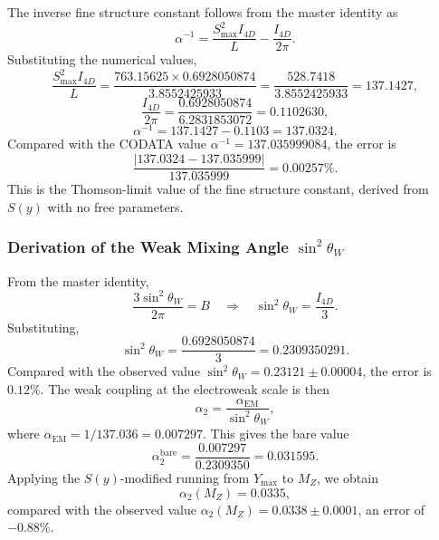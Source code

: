 \documentclass[a4paper,1pt,oneside,openany]{book}
\begin{document}
The inverse fine structure constant follows from the master identity as
\begin{equation}
\alpha^{-1} = \frac{S_{\max}^2 I_{4D}}{L} - \frac{I_{4D}}{2\pi}.
\label{eq:alpha-inv}
\end{equation}
Substituting the numerical values,
\begin{equation}
\frac{S_{\max}^2 I_{4D}}{L} = \frac{763.15625 \times 0.6928050874}{3.8552425933} = \frac{528.7418}{3.8552425933} = 137.1427,
\label{eq:alpha-term1}
\end{equation}
\begin{equation}
\frac{I_{4D}}{2\pi} = \frac{0.6928050874}{6.2831853072} = 0.1102630,
\label{eq:alpha-term2}
\end{equation}
\begin{equation}
\boxed{\alpha^{-1} = 137.1427 - 0.1103 = 137.0324.}
\label{eq:alpha-final}
\end{equation}
Compared with the CODATA value $\alpha^{-1} = 137.035999084$, the error is
\begin{equation}
\frac{|137.0324 - 137.035999|}{137.035999} = 0.00257\%.
\label{eq:alpha-error}
\end{equation}
This is the Thomson-limit value of the fine structure constant, derived from $S(y)$ with no free parameters.

\subsubsection{Derivation of the Weak Mixing Angle $\sin^2\theta_W$}

From the master identity,
\begin{equation}
\frac{3\sin^2\theta_W}{2\pi} = B \quad \Longrightarrow \quad \sin^2\theta_W = \frac{I_{4D}}{3}.
\label{eq:sin2}
\end{equation}
Substituting,
\begin{equation}
\boxed{\sin^2\theta_W = \frac{0.6928050874}{3} = 0.2309350291.}
\label{eq:sin2-final}
\end{equation}
Compared with the observed value $\sin^2\theta_W = 0.23121 \pm 0.00004$, the error is $0.12\%$. The weak coupling at the electroweak scale is then
\begin{equation}
\alpha_2 = \frac{\alpha_{\mathrm{EM}}}{\sin^2\theta_W},
\label{eq:alpha2-def}
\end{equation}
where $\alpha_{\mathrm{EM}} = 1/137.036 = 0.007297$. This gives the bare value
\begin{equation}
\alpha_2^{\mathrm{bare}} = \frac{0.007297}{0.2309350} = 0.031595.
\label{eq:alpha2-bare}
\end{equation}
Applying the $S(y)$-modified running from $Y_{\max}$ to $M_Z$, we obtain
\begin{equation}
\boxed{\alpha_2(M_Z) = 0.0335,}
\label{eq:alpha2-final}
\end{equation}
compared with the observed value $\alpha_2(M_Z) = 0.0338 \pm 0.0001$, an error of $-0.88\%$.
\end{document}
